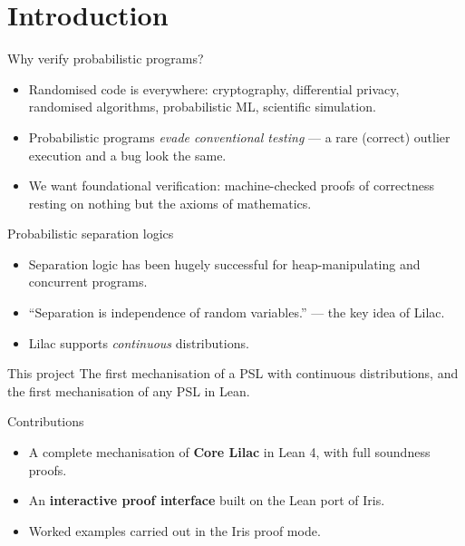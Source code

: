 \section{Introduction}

\begin{frame}{Why verify probabilistic programs?}
  \begin{itemize}
    \item Randomised code is everywhere: cryptography, differential privacy,
          randomised algorithms, probabilistic ML, scientific simulation.
    \item Probabilistic programs \emph{evade conventional testing} --- a rare
          (correct) outlier execution and a bug look the same.
    \item We want \alert{foundational verification}: machine-checked proofs of
          correctness resting on nothing but the axioms of mathematics.
  \end{itemize}
\end{frame}

\begin{frame}{Probabilistic separation logics}
  \begin{itemize}
    \item Separation logic has been hugely successful for heap-manipulating and
          concurrent programs.
    \item \alert{``Separation is independence of random variables.''}
          --- the key idea of Lilac.
    \item Lilac supports \emph{continuous} distributions.
  \end{itemize}
  \pause
  \begin{block}{This project}
    The first mechanisation of a PSL with continuous distributions, and the
    first mechanisation of any PSL in Lean.
  \end{block}
\end{frame}

\begin{frame}{Contributions}
  \begin{itemize}
    \item A complete mechanisation of \textbf{Core Lilac} in Lean 4, with full
          soundness proofs.
    \item An \textbf{interactive proof interface} built on the Lean port of Iris.
    \item Worked examples carried out in the Iris proof mode.
  \end{itemize}
\end{frame}
